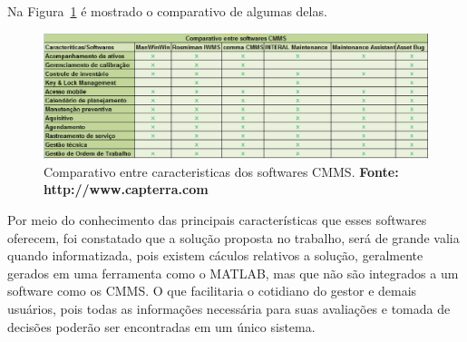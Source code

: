 Na Figura~\ref{checklist_capterra} é mostrado o comparativo de algumas delas.

\graphicspath{{figuras/}}
\begin{figure}[h]
\centering
\includegraphics[width=1.0\textwidth]{feat_cmms.eps}
\caption{Comparativo entre caracteristicas dos softwares CMMS. \textbf{Fonte: http://www.capterra.com}}
\label{checklist_capterra}
\end{figure}

Por meio do conhecimento das principais características que esses softwares oferecem, foi constatado que a solução proposta no trabalho, será de grande valia quando informatizada, pois existem cáculos relativos a solução, geralmente gerados em uma ferramenta como o MATLAB, mas que não são integrados a um software como os CMMS. O que facilitaria o cotidiano do gestor e demais usuários, pois todas as informações necessária para suas avaliações e tomada de decisões poderão ser encontradas em um único sistema.